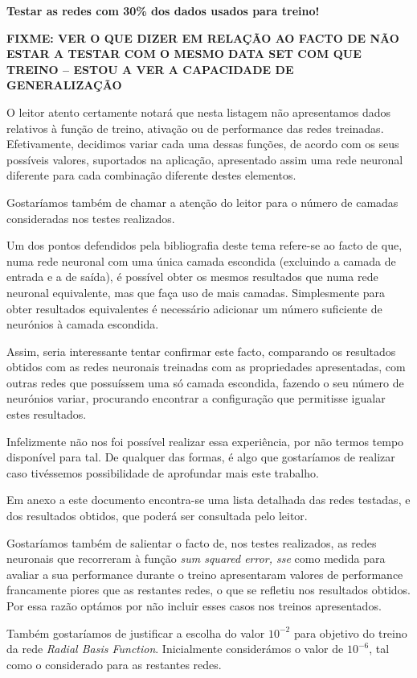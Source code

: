 \documentclass{article}
\begin{document}
\textbf{Testar as redes com 30\% dos dados usados para treino!}

\textbf{FIXME: VER O QUE DIZER EM RELAÇÃO AO FACTO DE NÃO ESTAR A TESTAR COM O MESMO DATA SET COM QUE TREINO -- ESTOU A VER A CAPACIDADE DE GENERALIZAÇÃO}

O leitor atento certamente notará que nesta listagem não apresentamos dados relativos à função de treino, ativação ou de performance das redes treinadas. Efetivamente, decidimos variar cada uma dessas funções, de acordo com os seus possíveis valores, suportados na aplicação, apresentado assim uma rede neuronal diferente para cada combinação diferente destes elementos.

Gostaríamos também de chamar a atenção do leitor para o número de camadas consideradas nos testes realizados.

Um dos pontos defendidos pela bibliografia deste tema refere-se ao facto de que, numa rede neuronal com uma única camada escondida (excluindo a camada de entrada e a de saída), é possível obter os mesmos resultados que numa rede neuronal equivalente, mas que faça uso de mais camadas. Simplesmente para obter resultados equivalentes é necessário adicionar um número suficiente de neurónios à camada escondida.

Assim, seria interessante tentar confirmar este facto, comparando os resultados obtidos com as redes neuronais treinadas com as propriedades apresentadas, com outras redes que possuíssem uma só camada escondida, fazendo o seu número de neurónios variar, procurando encontrar a configuração que permitisse igualar estes resultados.

Infelizmente não nos foi possível realizar essa experiência, por não termos tempo disponível para tal. De qualquer das formas, é algo que gostaríamos de realizar caso tivéssemos possibilidade de aprofundar mais este trabalho.

Em anexo a este documento encontra-se uma lista detalhada das redes testadas, e dos resultados obtidos, que poderá ser consultada pelo leitor.

Gostaríamos também de salientar o facto de, nos testes realizados, as redes neuronais que recorreram à função \emph{sum squared error, sse} como medida para avaliar a sua performance durante o treino apresentaram valores de performance francamente piores que as restantes redes, o que se refletiu nos resultados obtidos. Por essa razão optámos por não incluir esses casos nos treinos apresentados.

Também gostaríamos de justificar a escolha do valor $10^{-2}$ para objetivo do treino da rede \emph{Radial Basis Function}. Inicialmente considerámos o valor de $10^{-6}$, tal como o considerado para as restantes redes.
\end{document}
